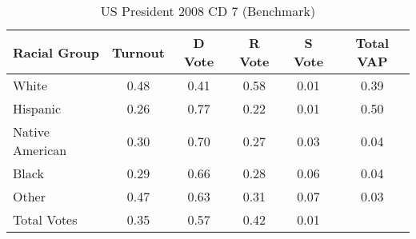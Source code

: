 \begin{table}[htb]
\begin{center}
\caption{US President 2008 CD 7 (Benchmark)}
\label{pres08_vap_cd_7_benchmark}
\begin{tabular}{lccccc}
  \hline
Racial Group & Turnout & D Vote & R Vote & S Vote & Total VAP \\ 
  \hline
White & 0.48 & 0.41 & 0.58 & 0.01 & 0.39 \\ 
  Hispanic & 0.26 & 0.77 & 0.22 & 0.01 & 0.50 \\ 
  Native American & 0.30 & 0.70 & 0.27 & 0.03 & 0.04 \\ 
  Black & 0.29 & 0.66 & 0.28 & 0.06 & 0.04 \\ 
  Other & 0.47 & 0.63 & 0.31 & 0.07 & 0.03 \\ 
  Total Votes & 0.35 & 0.57 & 0.42 & 0.01 &  \\ 
   \hline
\end{tabular}
\end{center}
\end{table}
